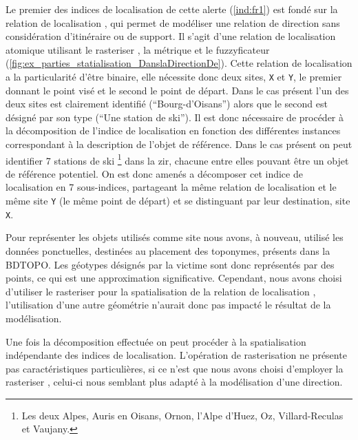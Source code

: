 Le premier des indices de localisation de cette alerte (\ref{ind:fr1})
est fondé sur la relation de localisation
, qui permet de
modéliser une relation de direction sans considération d'itinéraire ou
de support. Il s'agit d'une relation de localisation atomique
utilisant le rasteriser , la métrique
 et le fuzzyficateur 
(\autoref{fig:ex_parties_statialisation_DanslaDirectionDe}). Cette
relation de localisation a la particularité d'être binaire, elle
nécessite donc deux sites, \texttt{X} et \texttt{Y}, le premier
donnant le point visé et le second le point de départ. Dans le cas
présent l'un des deux sites est clairement identifié
(\enquote{Bourg-d'Oisans}) alors que le second est désigné par son
type (\enquote{Une station de ski}). Il est donc nécessaire de
procéder à la décomposition de l'indice de localisation en fonction
des différentes instances correspondant à la description de l'objet de
référence. Dans le cas présent on peut identifier 7 stations de ski
\footnote{Les deux Alpes, Auris en Oisans, Ornon, l'Alpe d'Huez, Oz,
  Villard-Reculas et Vaujany.}  dans la \ac{zir}, chacune entre elles
pouvant être un objet de référence potentiel. On est donc amenés a
décomposer cet indice de localisation en 7 sous-indices, partageant la
même relation de localisation et le même site \texttt{Y} (\ie le même
point de départ) et se distinguant par leur destination, site
\texttt{X}.

Pour représenter les objets utilisés comme site nous avons, à nouveau,
utilisé les données ponctuelles, destinées au placement des toponymes,
présents dans la BDTOPO. Les géotypes désignés par la victime sont
donc représentés par des points, ce qui est une approximation
significative. Cependant, nous avons choisi d'utiliser le rasteriser
 pour la spatialisation de la relation de
localisation ,
l'utilisation d'une autre géométrie n'aurait donc pas impacté le
résultat de la modélisation.

Une fois la décomposition effectuée on peut procéder à la
spatialisation indépendante des indices de localisation. L'opération
de rasterisation ne présente pas caractéristiques particulières, si ce
n'est que nous avons choisi d'employer la rasteriser
, celui-ci nous semblant plus adapté à la
modélisation d'une direction.

